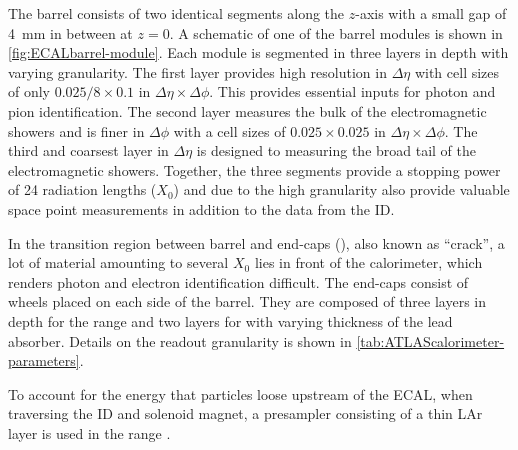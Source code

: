 The barrel consists of two identical segments along the $z$-axis with a small gap of \SI{4}{\milli\meter} in between at $z=0$. A schematic of one of the barrel modules is shown in \cref{fig:ECALbarrel-module}. Each module is segmented in three layers in depth with varying granularity. The first layer provides high resolution in $\Delta \eta$ with cell sizes of only $0.025 / 8 \times 0.1$ in $\Delta \eta \times \Delta \phi$. This provides essential inputs for photon and pion identification. The second layer measures the bulk of the electromagnetic showers and is finer in $\Delta \phi$ with a cell sizes of $0.025 \times 0.025$ in $\Delta \eta \times \Delta \phi$. The third and coarsest layer in $\Delta \eta$ is designed to measuring the broad tail of the electromagnetic showers.
Together, the three segments provide a stopping power of 24 radiation lengths ($X_0$) and due to the high granularity also provide valuable space point measurements in addition to the data from the ID.

In the transition region between barrel and end-caps (), also known as ``crack'', a lot of material amounting to several $X_0$ lies in front of the calorimeter, which renders photon and electron identification difficult.
The end-caps consist of wheels placed on each side of the barrel.
They are composed of three layers in depth for the range  and two layers for  with varying thickness of the lead absorber. Details on the readout granularity is shown in \cref{tab:ATLAScalorimeter-parameters}.

To account for the energy that particles loose upstream of the ECAL, when traversing the ID and solenoid magnet, a presampler consisting of a thin LAr layer is used in the range .


